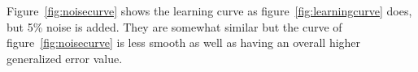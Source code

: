 Figure~\ref{fig:noisecurve} shows the learning curve as figure~\ref{fig:learningcurve} does, but 5\% noise is added. They are somewhat similar but the curve of figure~\ref{fig:noisecurve} is less smooth as well as having an overall higher generalized error value.